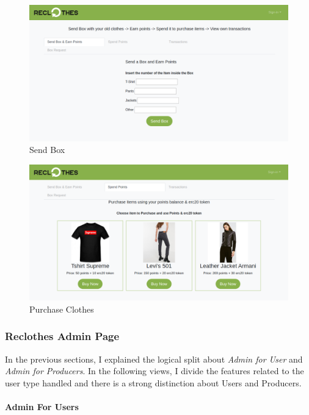 \begin{figure}[h!]
    \centering
    \includegraphics[totalheight=7.5cm]{img/dapp/user-send.png}
    \caption{Send Box}
    \label{fig:send_box}
\end{figure}

\begin{figure}[h!]
    \centering
    \includegraphics[totalheight=7.5cm]{img/dapp/user-buy.png}
    \caption{Purchase Clothes}
    \label{fig:purchase_clothes}
\end{figure}

\newpage
\subsubsection{Reclothes Admin Page}

In the previous sections, I explained the logical split about \textit{Admin for User} and \textit{Admin for Producers}.
In the following views, I divide the features related to the user type handled and there is a strong distinction about 
Users and Producers.

\paragraph{Admin For Users}

